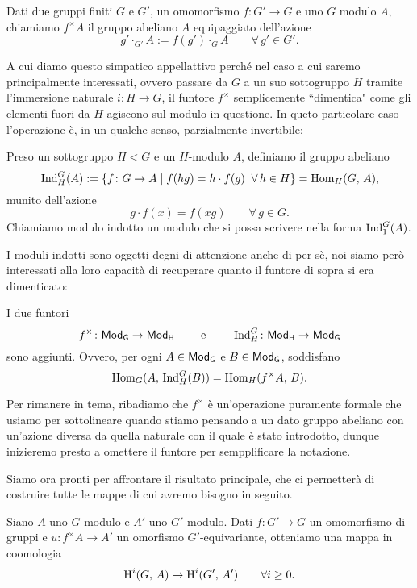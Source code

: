 \begin{definition}
	Dati due gruppi finiti $ G $ e $ G' $, un omomorfismo $ f \colon G' \to G $ e uno $ G $ modulo $ A $, chiamiamo $ f^\times A $ il gruppo abeliano $ A $ equipaggiato dell'azione
	\[ g' \cdot_{G'} A := f(g') \cdot_{G} A \qquad \forall\, g' \in G'. \]
\end{definition}

A cui diamo questo simpatico appellattivo perché nel caso a cui saremo principalmente interessati, ovvero passare da $ G $ a un suo sottogruppo $ H $ tramite l'immersione naturale $ i \colon H \to G $, il funtore $ f^\times $ semplicemente \textquotedblleft dimentica" come gli elementi fuori da $ H $ agiscono sul modulo in questione. In queto particolare caso l'operazione è, in un qualche senso, parzialmente invertibile:

\begin{definition}
	Preso un sottogruppo $ H < G $ e un $ H $-modulo $ A $, definiamo il gruppo abeliano
	\[ \operatorname{Ind}_H^G(A) := \{ f \colon G \to A \mid f(hg) = h \cdot f(g) \;\; \forall\, h \in H \} = \operatorname{Hom}_H(G, \, A), \]
	munito dell'azione 
	\[g \cdot f(x) = f(xg) \qquad\forall\, g \in G. \]
	Chiamiamo modulo indotto un modulo che si possa scrivere nella forma $ \operatorname{Ind}_1^G(A) $.
\end{definition}

I moduli indotti sono oggetti degni di attenzione anche di per sè, noi siamo però interessati alla loro capacità di recuperare quanto il funtore di sopra si era dimenticato: 

\begin{proposition}\label{aggiunzione}
	I due funtori
	\[ f^\times \colon \mathsf{Mod}_\mathsf{G} \to \mathsf{Mod}_\mathsf{H} \qquad\text{ e }\qquad  \operatorname{Ind}_H^G \colon \mathsf{Mod}_\mathsf{H} \to \mathsf{Mod}_\mathsf{G} \]
	sono aggiunti. Ovvero, per ogni $ A \in \mathsf{Mod}_\mathsf{G} $ e $ B \in \mathsf{Mod}_\mathsf{G} $, soddisfano
	\[ \operatorname{Hom}_G(A,\, \operatorname{Ind}_H^G(B)) = \operatorname{Hom}_H(f^\times A, \, B). \]
\end{proposition}

Per rimanere in tema, ribadiamo che $ f^\times $ è un'operazione puramente formale che usiamo per sottolineare quando stiamo pensando a un dato gruppo abeliano con un'azione diversa da quella naturale con il quale è stato introdotto, dunque inizieremo presto a omettere il funtore per sempplificare la notazione.

Siamo ora pronti per affrontare il risultato principale, che ci permetterà di costruire tutte le mappe di cui avremo bisogno in seguito.
\begin{proposition}\label{funct}
	Siano  $ A $ uno $ G $ modulo e $ A' $ uno $ G' $ modulo. Dati $ f \colon G' \to G $ un omomorfismo di gruppi e $ u \colon f^\times A \to A' $ un omorfismo $ G' $-equivariante, otteniamo una mappa in coomologia
	\[ \operatorname{H}^i(G, \, A) \to \operatorname{H}^i(G', \, A') \qquad\forall i \geq 0. \]
\end{proposition}


